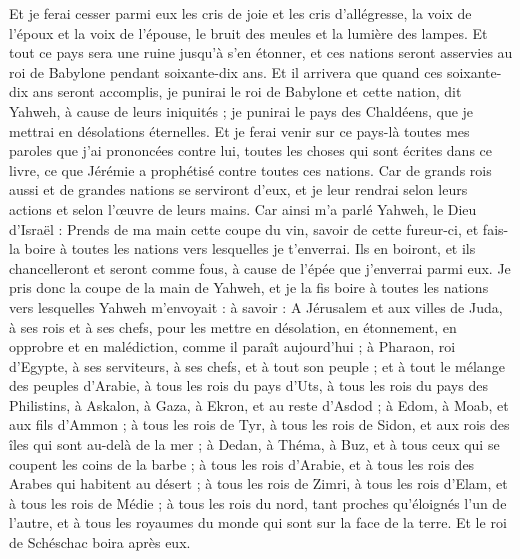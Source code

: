 \begin{multicols}{2}
Et je ferai cesser parmi eux les cris de joie et les cris d'allégresse, la voix de l'époux et la voix de l'épouse, le bruit des meules et la lumière des lampes.
Et tout ce pays sera une ruine jusqu'à s'en étonner, et ces nations seront asservies au roi de Babylone pendant soixante-dix ans.
Et il arrivera que quand ces soixante-dix ans seront accomplis, je punirai le roi de Babylone et cette nation, dit Yahweh, à cause de leurs iniquités ; je punirai le pays des Chaldéens, que je mettrai en désolations éternelles.
Et je ferai venir sur ce pays-là toutes mes paroles que j'ai prononcées contre lui, toutes les choses qui sont écrites dans ce livre, ce que Jérémie a prophétisé contre toutes ces nations.
Car de grands rois aussi et de grandes nations se serviront d'eux, et je leur rendrai selon leurs actions et selon l'œuvre de leurs mains.
Car ainsi m'a parlé Yahweh, le Dieu d'Israël : Prends de ma main cette coupe du vin, savoir de cette fureur-ci, et fais-la boire à toutes les nations vers lesquelles je t'enverrai.
Ils en boiront, et ils chancelleront et seront comme fous, à cause de l'épée que j'enverrai parmi eux.
Je pris donc la coupe de la main de Yahweh, et je la fis boire à toutes les nations vers lesquelles Yahweh m'envoyait :
 à savoir : A Jérusalem et aux villes de Juda, à ses rois et à ses chefs, pour les mettre en désolation, en étonnement, en opprobre et en malédiction, comme il paraît aujourd'hui ;
à Pharaon, roi d'Egypte, à ses serviteurs, à ses chefs, et à tout son peuple ;
et à tout le mélange des peuples d'Arabie, à tous les rois du pays d'Uts, à tous les rois du pays des Philistins, à Askalon, à Gaza, à Ekron, et au reste d'Asdod ;
à Edom, à Moab, et aux fils d'Ammon ;
à tous les rois de Tyr, à tous les rois de Sidon, et aux rois des îles qui sont au-delà de la mer ;
à Dedan, à Théma, à Buz, et à tous ceux qui se coupent les coins de la barbe ;
à tous les rois d'Arabie, et à tous les rois des Arabes qui habitent au désert ;
à tous les rois de Zimri, à tous les rois d'Elam, et à tous les rois de Médie ;
à tous les rois du nord, tant proches qu'éloignés l'un de l'autre, et à tous les royaumes du monde qui sont sur la face de la terre. Et le roi de Schéschac boira après eux.

\end{multicols}
